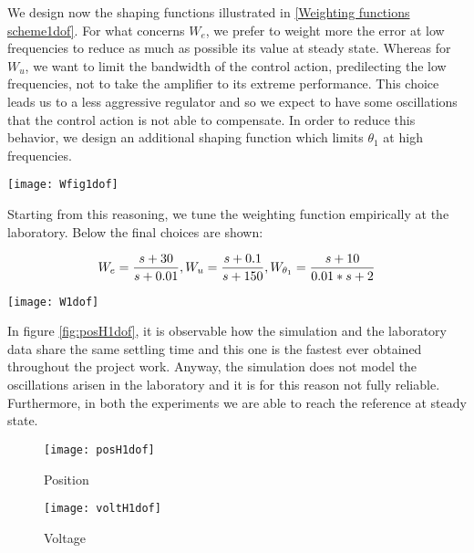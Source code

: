 We design now the shaping functions illustrated in \ref{Weighting functions scheme1dof}. For what concerns $W_e$, we prefer to weight more the error at low frequencies to reduce as much as possible its value at steady state. Whereas for $W_u$, we want to limit the bandwidth of the control action, predilecting the low frequencies, not to take the amplifier to its extreme performance. This choice leads us to a less aggressive regulator and so we expect to have some oscillations that the control action is not able to compensate. In order to reduce this behavior, we design an additional shaping function which limits $\theta_{1}$ at high frequencies.

\begin{figure*}[h]
	\centering
	\texttt{[image: Wfig1dof]}
	\caption{Weighting functions scheme}
	\label{Weighting functions scheme1dof}
\end{figure*}
Starting from this reasoning, we tune the weighting function empirically at the laboratory. Below the final choices are shown:

\begin{equation}
	W_e=
	\frac{s+30}{s+0.01}
	\\
	,
	\\
	W_u=
	\frac{s+0.1}{s+150}
	\\
	,
	\\
	W_{\theta_{1}}=
	\frac{s+10}{0.01*s+2}
\end{equation}

\begin{figure*}[h]
	\centering
	\texttt{[image: W1dof]}
	\caption{Weighting functions}
\end{figure*}

 In figure \ref{fig:posH1dof}, it is observable how the simulation and the laboratory data share the same settling time and this one is the fastest ever obtained throughout the project work. Anyway, the simulation does not model the oscillations arisen in the laboratory and it is for this reason not fully reliable. Furthermore, in both the experiments we are able to reach the reference at steady state.
 
 \begin{figure*}[h]
 	\centering
 	\begin{subfigure}{0.5\columnwidth}
 		\texttt{[image: posH1dof]}
 		\caption{Position}
 	\end{subfigure}
 	\begin{subfigure}{0.45\columnwidth}
 		\texttt{[image: voltH1dof]}
 		\caption{Voltage}
 	\end{subfigure}
 	\caption{Position step response}
 	\label{fig:posH1dof}
 \end{figure*}

